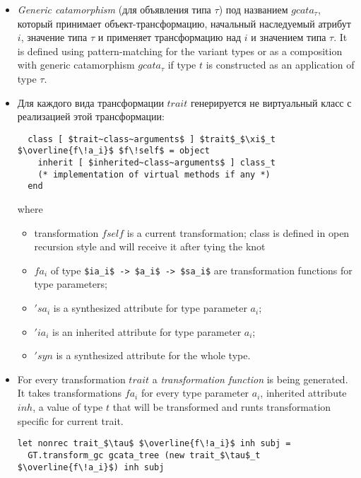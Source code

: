 \documentclass[acmsmall,review,anonymous]{acmart}\settopmatter{printfolios=true,printccs=false,printacmref=false}
\begin{document}
\begin{itemize}
  \item \emph{Generic catamorphism} (для объявления типа $\tau$) под названием $gcata_\tau$, который принимает объект-трансформацию, начальный наследуемый атрибут $i$, значение типа $\tau$ и применяет трансформацию над $i$ и значением типа $\tau$. It is defined using pattern-matching for the variant types or as a composition with generic catamorphism $gcata_\tau$ if type $t$ is constructed as an application of type $\tau$.
  \item Для каждого вида трансформации $trait$ генерируется не виртуальный класс с реализацией этой трансформации:

  \begin{lstlisting}
  class [ $trait~class~arguments$ ] $trait$_$\xi$_t $\overline{f\!a_i}$ $f\!self$ = object
    inherit [ $inherited~class~arguments$ ] class_t
    (* implementation of virtual methods if any *)
  end
  \end{lstlisting}
  where \begin{itemize}
          \item transformation $f\!self$ is a current transformation; class is defined in open recursion style and will receive it after tying the knot
          \item $f\!a_i$ of type \lstinline{$ia_i$ -> $a_i$ -> $sa_i$} are transformation functions for type parameters;
          \item $'sa_i$ is a synthesized attribute for type parameter $a_i$;
          \item $'ia_i$ is an inherited attribute for type parameter $a_i$;
          \item $'syn$ is a synthesized attribute for the whole type.
  \end{itemize}
  \item For every transformation $trait$ a \emph{transformation function} is being generated. It takes transformations $f\!a_i$ for every type parameter $a_i$, inherited attribute $inh$, a value of type $t$ that will be transformed and runts transformation specific for current trait.
  \begin{lstlisting}
let nonrec trait_$\tau$ $\overline{f\!a_i}$ inh subj =
  GT.transform_gc gcata_tree (new trait_$\tau$_t $\overline{f\!a_i}$) inh subj
  \end{lstlisting}  
\end{itemize}
\end{document}
